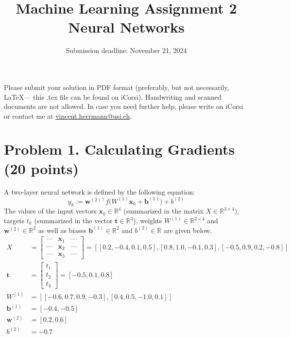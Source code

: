 \documentclass[a4paper,12pt]{article}
\title{Machine Learning Assignment 2\\
Neural Networks}
\date{Submission deadline: November 21, 2024}
\author{}
\begin{document}
\maketitle

\noindent Please submit your solution in PDF format (preferably, but not necessarily, \LaTeX --- this .tex file can be found on iCorsi). Handwriting and scanned documents are not allowed. 
In case you need further help, please write on iCorsi or contact me at \href{mailto:vincent.herrmann@idsia.ch}{vincent.herrmann@usi.ch}.

\section{Problem 1. Calculating Gradients (20 points)}
A two-layer neural network is defined by the following equation: 
$$
y_k := \mathbf{w}^{(2) \top} f\big( W^{(1)} \mathbf{x}_k + \mathbf{b}^{(1)}\big) + b^{(2)}
$$
The values of the input vectors $\mathbf{x}_k \in \mathbb{R}^4$ (summarized in the matrix $X \in \mathbb{R}^{3 \times 4}$), targets $t_k$ (summarized in the vector $\mathbf{t} \in \mathbb{R}^3$), weights $W^{(1)} \in \mathbb{R}^{2 \times 4}$ and $\mathbf{w}^{(2)} \in \mathbb{R}^2$ as well as biases $\mathbf{b}^{(1)} \in \mathbb{R}^2$ and $b^{(2)} \in \mathbb{R}$ are given below. 
\begin{align*}
    X &=
    \begin{bmatrix}
        \text{---} & \mathbf{x}_1 & \text{---} \\
        \text{---} & \mathbf{x}_2 & \text{---} \\
        \text{---} & \mathbf{x}_3 & \text{---}
    \end{bmatrix}
    = [[ 0.2, -0.4, 0.1, 0.5], [ 0.8, 1.0, -0.1, 0.3], [-0.5,  0.9, 0.2, -0.8]] \\
    \mathbf{t} &= 
    \begin{bmatrix}
        t_1 \\
        t_2 \\
        t_3 
    \end{bmatrix}
    = [-0.5, 0.1, 0.8] \\
    W^{(1)} &= [[-0.6, 0.7,  0.9, -0.3], [0.4,  0.5, -1.0, 0.1]] \\
    \mathbf{b}^{(1)} &= [-0.4, -0.5] \\
    \mathbf{w}^{(2)} &= [ 0.2, 0.6] \\
    b^{(2)} &= -0.7 \\
\end{align*}
\end{document}
